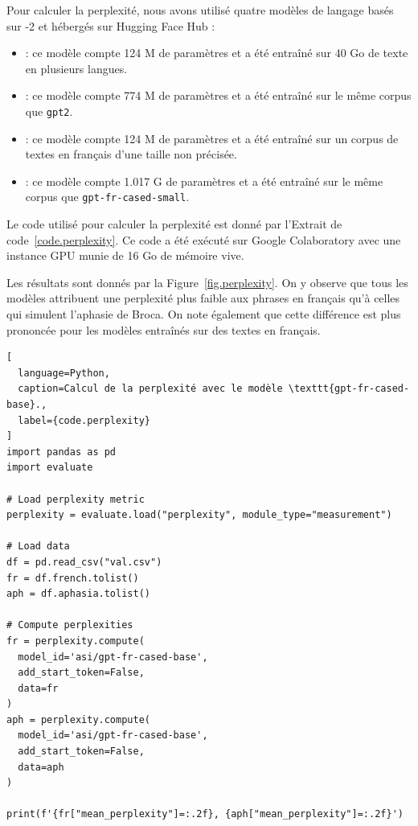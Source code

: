 Pour calculer la perplexité, nous avons utilisé quatre modèles de langage basés sur -2
et hébergés sur \foreignlanguage{english}{Hugging Face Hub} :
\begin{itemize}
  \item {} : 
  ce modèle compte 124 M de paramètres et a été entraîné sur 40 Go de texte en plusieurs langues.
  \item {} :
  ce modèle compte 774 M de paramètres et a été entraîné sur le même corpus que \verb|gpt2|.
  \item {} :
  ce modèle compte 124 M de paramètres et a été entraîné sur un corpus de textes en français d'une taille non précisée.
  \item {} :
  ce modèle compte 1.017 G de paramètres et a été entraîné sur le même corpus que \verb|gpt-fr-cased-small|.
\end{itemize}
Le code utilisé pour calculer la perplexité est donné par l'Extrait de code~\ref{code.perplexity}.
Ce code a été exécuté sur Google Colaboratory avec une instance GPU munie de 16 Go de mémoire vive.

Les résultats sont donnés par la Figure~\ref{fig.perplexity}.
On y observe que tous les modèles attribuent une perplexité plus faible 
aux phrases en français qu'à celles qui simulent l'aphasie de Broca.
On note également que cette différence est plus prononcée pour les modèles entraînés sur des textes en français.

\begin{lstlisting}[
  language=Python,
  caption=Calcul de la perplexité avec le modèle \texttt{gpt-fr-cased-base}.,
  label={code.perplexity}
]
import pandas as pd
import evaluate

# Load perplexity metric
perplexity = evaluate.load("perplexity", module_type="measurement")

# Load data
df = pd.read_csv("val.csv")
fr = df.french.tolist()
aph = df.aphasia.tolist()

# Compute perplexities
fr = perplexity.compute(
  model_id='asi/gpt-fr-cased-base', 
  add_start_token=False, 
  data=fr
)
aph = perplexity.compute(
  model_id='asi/gpt-fr-cased-base', 
  add_start_token=False, 
  data=aph
)

print(f'{fr["mean_perplexity"]=:.2f}, {aph["mean_perplexity"]=:.2f}')
\end{lstlisting}

